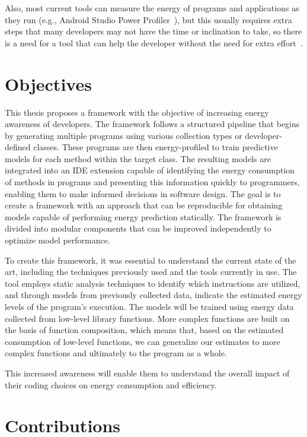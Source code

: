Also, most current tools can measure the energy of programs and applications as they run (e.g., Android Studio Power Profiler~\cite{android_power_profiler}), but this usually requires extra steps that many developers may not have the time or inclination to take, so there is a need for a tool that can help the developer without the need for extra effort~\cite{10.1145/3154384}.

\section{Objectives}


This thesis proposes a framework with the objective of increasing energy awareness of developers. The framework follows a structured pipeline that begins by generating multiple programs using various collection types or developer-defined classes. These programs are then energy-profiled to train predictive models for each method within the target class.
The resulting models are integrated into an IDE extension capable of identifying the energy consumption of methods in programs and presenting this information quickly to programmers, enabling them to make informed decisions in software design. The goal is to create a framework with an approach that can be reproducible for obtaining models capable of performing energy prediction statically. The framework is divided into modular components that can be improved independently to optimize model performance.


To create this framework, it was essential to understand the current state of the art, including the techniques previously used and the tools currently in use. The tool employs static analysis techniques to identify which instructions are utilized, and through models from previously collected data, indicate the estimated energy levels of the program's execution. The models will be trained using energy data collected from low-level library functions. More complex functions are built on the basis of function composition, which means that, based on the estimated consumption of low-level functions, we can generalize our estimates to more complex functions and ultimately to the program as a whole. 

This increased awareness will enable them to understand the overall impact of their coding choices on energy consumption and efficiency.



\section{Contributions}


